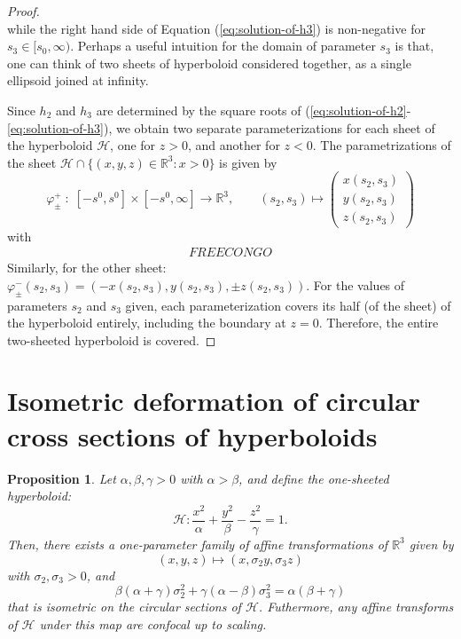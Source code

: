 \documentclass[10pt, a4paper]{article}
\theoremstyle{BoldTopSpacing}
\theoremstyle{BoldTopSpacing}
\theoremstyle{BoldTopSpacing}
\theoremstyle{BoldTopBottomSpacing}
\theoremstyle{BoldTopSpacing}
\newtheorem{proposition}{Proposition}[section]
\theoremstyle{BoldTopBottomSpacing}
\theoremstyle{remark}
\begin{document}
\begin{proof}
\[\]
while the right hand side of Equation (\ref{eq:solution-of-h3}) is non-negative for $s_{3} \in [s_{0}, \infty)$. Perhaps a useful intuition for the domain of parameter $s_{3}$ is that, one can think of two sheets of hyperboloid \textemdash considered together, as a single ellipsoid joined at infinity. \par
Since $h_{2}$ and $h_{3}$ are determined by the square roots of (\ref{eq:solution-of-h2}-\ref{eq:solution-of-h3}), we obtain two separate parameterizations for each sheet of the hyperboloid $\mathcal{H}$, one for $z > 0$, and another for $z < 0$. The parametrizations of the sheet $\mathcal{H} \cap \{ (x, y, z) \in \mathbb{R}^3 : x > 0\}$ is given by
\[
    \varphi^{+}_{\pm} \; : \; [-s^{0}, s^{0}] \times [-s^{0}, \infty] \to \mathbb{R}^3, \quad \quad (s_{2}, s_{3}) \mapsto \begin{pmatrix}
        x(s_{2}, s_{3}) \\
        y(s_{2}, s_{3}) \\
        z(s_{2}, s_{3})
        \end{pmatrix}
\]
with
\begin{align*}
    FREE CONGO
\end{align*}
Similarly, for the other sheet: $\varphi^{-}_{\pm}(s_2, s_3) = \left(-x(s_{2}, s_{3}), y(s_{2}, s_{3}), \pm z(s_{2}, s_{3}) \right)$.
For the values of parameters $s_{2}$ and $s_{3}$ given, each parameterization covers its half (of the sheet) of the hyperboloid entirely, including the boundary at $z = 0$. Therefore, the entire two-sheeted hyperboloid is covered.
\end{proof}
\pagebreak
\section{Isometric deformation of circular cross sections of hyperboloids}
\begin{proposition}
\label{prop:affine-transformation-one-sheeted}
Let $\alpha, \beta, \gamma > 0$ with $\alpha > \beta$, and define the one-sheeted hyperboloid:
\[
    \mathcal{H}: \frac{x^2}{\alpha} + \frac{y^2}{\beta} - \frac{z^2}{\gamma} = 1.
\]
Then, there exists a one-parameter family of affine transformations of $\mathbb{R}^3$ given by
\[
    (x, y, z) \mapsto (x, \sigma_{2}y, \sigma_{3}z)
\]
with $\sigma_{2}, \sigma_{3} > 0$, and
\begin{equation}
\label{eq:sigmas-h1}
    \beta(\alpha + \gamma) \sigma_{2}^2 + \gamma(\alpha - \beta) \sigma_{3}^2 = \alpha (\beta + \gamma)
\end{equation}
that is isometric on the circular sections of $\mathcal{H}$. Futhermore, any affine transforms of $\mathcal{H}$ under this map are confocal up to scaling.
\end{proposition}
\end{document}
